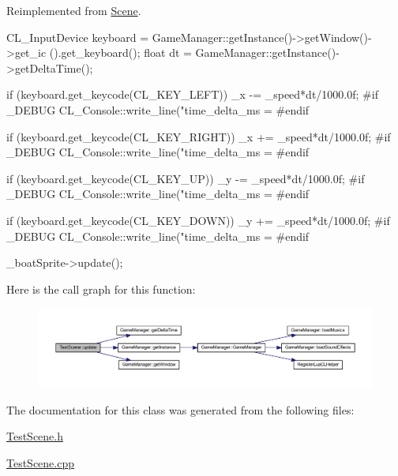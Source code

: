 Reimplemented from \hyperlink{class_scene_aa24c7e636c10e4e42650c1374b90bb80}{Scene}.


\begin{DoxyCode}
{
        CL_InputDevice keyboard = GameManager::getInstance()->getWindow()->get_ic
      ().get_keyboard();
        float dt = GameManager::getInstance()->getDeltaTime();

        if (keyboard.get_keycode(CL_KEY_LEFT))
        {
                _x -= _speed*dt/1000.0f;
#if _DEBUG
                CL_Console::write_line("time_delta_ms = %
#endif
        }

        if (keyboard.get_keycode(CL_KEY_RIGHT))
        {
                _x += _speed*dt/1000.0f;
#if _DEBUG
                CL_Console::write_line("time_delta_ms = %
#endif
        }

        if (keyboard.get_keycode(CL_KEY_UP))
        {
                _y -= _speed*dt/1000.0f;
#if _DEBUG
                CL_Console::write_line("time_delta_ms = %
#endif
        }

        if (keyboard.get_keycode(CL_KEY_DOWN))
        {
                _y += _speed*dt/1000.0f;
#if _DEBUG
                CL_Console::write_line("time_delta_ms = %
#endif
        }

        _boatSprite->update();
}
\end{DoxyCode}


Here is the call graph for this function:
\nopagebreak
\begin{figure}[H]
\begin{center}
\leavevmode
\includegraphics[width=400pt]{de/d8c/class_test_scene_a7bfc7a796b5837eb35b03f878d623fe1_cgraph}
\end{center}
\end{figure}




The documentation for this class was generated from the following files:\begin{DoxyCompactItemize}
\item 
\hyperlink{_test_scene_8h}{TestScene.h}\item 
\hyperlink{_test_scene_8cpp}{TestScene.cpp}\end{DoxyCompactItemize}
